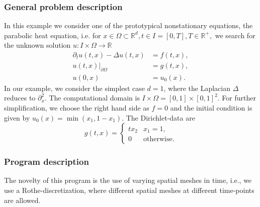 \subsubsection{General problem description}

In this example we consider one of the prototypical nonstationary equations, the parabolic heat equation, i.e. for $x \in \Omega \subset \mathbb{R}^d, t\in I =[0,T], T\in \mathbb{R}^+,$ we search for the unknown solution $u:I \times \Omega \rightarrow \mathbb{R}$
\begin{align*}
\partial_t u(t,x) - \Delta u(t,x) &= f(t,x),\\
u(t,x)|_{\partial \Omega} &= g(t,x),\\
u(0,x) &= u_0(x).
\end{align*} In our example, we consider the simplest case $d=1$,
where the Laplacian $\Delta$ reduces to $\partial_x^2$. The
computational domain is $ I\times \Omega = [0,1] \times [0,1]^2$. For
further simplification, we choose the right hand side as $f=0$ and the
initial condition is given by $u_0(x) = \min(x_1,1-x_1)$.
The Dirichlet-data are
\[
  g(t,x) = \begin{cases} tx_2 & x_1 = 1,\\
    0 & \text{otherwise.}
  \end{cases}
\]

\subsubsection{Program description}
The novelty of this program is the use of varying spatial meshes in
time, i.e., we use a  Rothe-discretization,
where different spatial meshes at different time-points are allowed.

